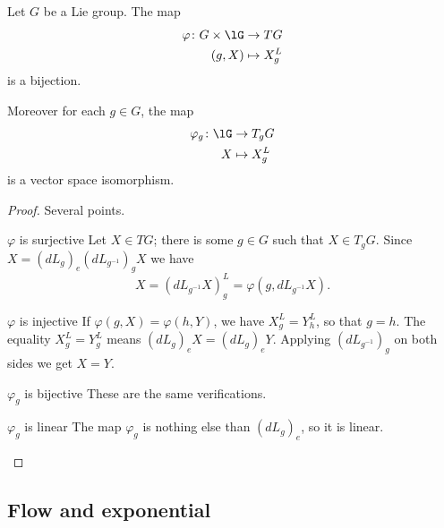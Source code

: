 \begin{proposition}
    Let \( G\) be a Lie group. The map
    \begin{equation}
        \begin{aligned}
            \varphi\colon G\times \lG&\to TG \\
            (g,X)&\mapsto X^L_g 
        \end{aligned}
    \end{equation}
    is a bijection.

    Moreover for each \( g\in G\), the map
    \begin{equation}
        \begin{aligned}
            \varphi_g\colon \lG&\to T_gG \\
           X&\mapsto X^L_g 
        \end{aligned}
    \end{equation}
    is a vector space isomorphism.
\end{proposition}

\begin{proof}
    Several points.
    \begin{subproof}
        \item[\( \varphi\) is surjective]
            Let \( X\in TG\); there is some \( g\in G\) such that \( X\in T_gG\). Since \( X=(dL_g)_e(dL_{g^{-1}})_gX\) we have
            \begin{equation}
                X=(dL_{g^{-1}}X)^L_g=\varphi(g,dL_{g^{-1}}X).
            \end{equation}
        \item[\( \varphi\) is injective]
            If \( \varphi(g,X)=\varphi(h,Y)\), we have \( X_g^L=Y^L_h\), so that \( g=h\). The equality  \( X_g^L=Y_g^L\) means \( (dL_g)_eX=(dL_g)_eY\). Applying \( (dL_{g^{-1}})_g\) on both sides we get \( X=Y\).
        \item[\( \varphi_g\) is bijective]
            These are the same verifications.
        \item[\( \varphi_g\) is linear]
            The map \( \varphi_g\) is nothing else than \( (dL_g)_e\), so it is linear.
    \end{subproof}
\end{proof}

\subsection{Flow and exponential}


